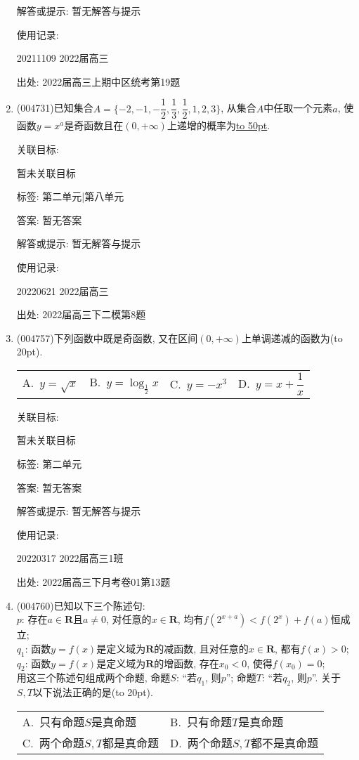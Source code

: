 \documentclass[10pt,a4paper]{article}
\newcommand{\blank}[1]{\underline{\hbox to #1pt{}}}
\newcommand{\bracket}[1]{(\hbox to #1pt{})}
\newcommand{\twoch}[4]{\par\begin{tabular}{p{.46\textwidth}p{.46\textwidth}}
A.~#1& B.~#2\\
C.~#3& D.~#4
\end{tabular}}
\newcommand{\fourch}[4]{\par\begin{tabular}{p{.23\textwidth}p{.23\textwidth}p{.23\textwidth}p{.23\textwidth}}
A.~#1 &B.~#2& C.~#3& D.~#4
\end{tabular}}
\begin{document}
\begin{enumerate}[1.]
解答或提示: 暂无解答与提示

使用记录:

20211109	2022届高三		


出处: 2022届高三上期中区统考第19题
\item { (004731)}已知集合$A=\{-2,-1,-\dfrac 12,\dfrac 13,\dfrac 12,1,2,3\}$, 从集合$A$中任取一个元素$a$, 使函数$y=x^a$是奇函数且在$(0,+\infty)$上递增的概率为\blank{50}.


关联目标:

暂未关联目标



标签: 第二单元|第八单元

答案: 暂无答案

解答或提示: 暂无解答与提示

使用记录:

20220621	2022届高三	


出处: 2022届高三下二模第8题
\item { (004757)}下列函数中既是奇函数, 又在区间$(0,+\infty)$上单调递减的函数为\bracket{20}.
\fourch{$y=\sqrt x$}{$y=\log_{\frac 12}x$}{$y=-x^3$}{$y=x+\dfrac 1x$}


关联目标:

暂未关联目标



标签: 第二单元

答案: 暂无答案

解答或提示: 暂无解答与提示

使用记录:

20220317	2022届高三1班	


出处: 2022届高三下月考卷01第13题
\item { (004760)}已知以下三个陈述句:\\
$p$: 存在$a\in \mathbf{R}$且$a\ne 0$, 对任意的$x\in \mathbf{R}$, 均有$f(2^{x+a})<f(2^x)+f(a)$恒成立;\\
$q_1$: 函数$y=f(x)$是定义域为$\mathbf{R}$的减函数, 且对任意的$x\in \mathbf{R}$, 都有$f(x)>0$;\\
$q_2$: 函数$y=f(x)$是定义域为$\mathbf{R}$的增函数, 存在$x_0<0$, 使得$f(x_0)=0$;\\
用这三个陈述句组成两个命题, 命题$S$: ``若$q_1$, 则$p$''; 命题$T$: ``若$q_2$, 则$p$''. 关于$S,T$以下说法正确的是\bracket{20}.
\twoch{只有命题$S$是真命题}{只有命题$T$是真命题}{两个命题$S,T$都是真命题}{两个命题$S,T$都不是真命题}



\end{enumerate}
\end{document}
